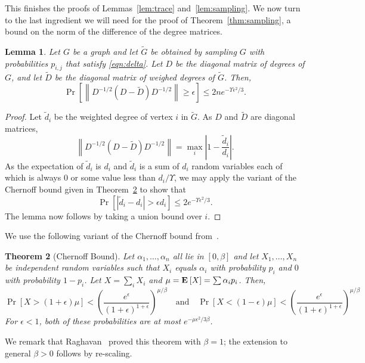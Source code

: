 \documentclass[11pt]{article}
\newtheorem{theorem}{Theorem}[section]
\newtheorem{lemma}[theorem]{Lemma}
\def\Dtil{\widetilde{D}}
\def\dtil{\tilde{d}}
\def\Gtil{\widetilde{G}}
\def\prob#1#2{\Pr_{#1}\left[ #2 \right]}
\def\expec#1#2{\mbox{\bf E}_{#1}\left[ #2 \right]}
\def\norm#1{\left\| #1 \right\|}
\def\abs#1{\left|#1  \right|}
\def\abs#1{\left|#1  \right|}
\begin{document}
This finishes the proofs of Lemmas~\ref{lem:trace} and~\ref{lem:sampling}.
We now turn to the last ingredient we will need for the proof of Theorem~\ref{thm:sampling},
  a bound on the norm of the difference of the degree matrices.


\begin{lemma}\label{lem:sampledDegrees}
Let $G$ be a graph and let $\Gtil$ be obtained by sampling $G$ with probabilities
  $p_{i,j}$ that satisfy \eqref{eqn:delta}.
Let $D$ be the diagonal matrix
  of degrees of $G$, and let $\Dtil$ be the diagonal matrix of weighed degrees
  of $\Gtil$.
Then,
\[
  \prob{}{\norm{D^{-1/2} (D - \Dtil) D^{-1/2}} \geq \epsilon  }
  \leq 2 n e^{- \Upsilon \epsilon^{2} / 3}.
\]
\end{lemma}
\begin{proof}
Let $\dtil_{i}$ be the weighted degree of vertex $i$ in $\Gtil$.
As $D$ and $\Dtil$ are diagonal matrices,
\[
\norm{D^{-1/2} (D - \Dtil) D^{-1/2}}
=
\max_{i} \abs{1 - \frac{\dtil_{i}}{d_{i}}}.
\]
As the expectation of $\dtil_{i}$ is $d_{i}$ and
  $\dtil_{i}$ is a sum of $d_{i}$ random variables
  each of which is always $0$ or some value less than $d_{i}/ \Upsilon$,
  we may apply the variant of the Chernoff bound given in
  Theorem~\ref{thm:chernoff}
  to show that
\[
\prob{}{\abs{\dtil_{i} - d_{i}} > \epsilon d_{i}} \leq
2 e^{-\Upsilon \epsilon^{2} / 3}.
\]
The lemma now follows by taking a union bound over $i$.
\end{proof}



We use the following variant of the Chernoff bound from~\cite{Raghavan}.
\begin{theorem}[Chernoff Bound]\label{thm:chernoff}
Let $\alpha_{1}, \dotsc , \alpha_{n}$ all lie in $[0,\beta ]$ and 
 let $X_{1}, \dotsc , X_{n}$ be independent random variables such
  that $X_{i}$ equals $\alpha_{i}$ with probability $p_{i}$
  and $0$ with probability $1-p_{i}$.
Let $X = \sum_{i} X_{i}$ and
  $\mu = \expec{}{X} = \sum \alpha_{i} p_{i}$.
Then,
\[
\prob{}{X > (1+\epsilon) \mu}
 <
\left(\frac{e^{\epsilon}}{(1+\epsilon)^{1+\epsilon }} \right)^{\mu / \beta }
\quad
\text{and}
\quad 
\prob{}{X < (1-\epsilon) \mu}
 <
\left(\frac{e^{\epsilon}}{(1+\epsilon)^{1+\epsilon }} \right)^{\mu / \beta }
\]
For $\epsilon < 1$,
  both of these probabilities are at most
  $e^{-\mu \epsilon^{2}/3 \beta }$.
\end{theorem}
We remark that Raghavan~\cite{Raghavan} proved this theorem with $\beta = 1$;
  the extension to general $\beta > 0$ follows by re-scaling.
\end{document}

